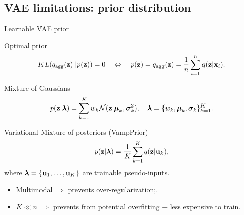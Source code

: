 \documentclass{beamer}
\begin{document}
\subsection{VAE limitations: prior distribution}
\begin{frame}{Learnable VAE prior}
	\begin{block}{Optimal prior}
		\vspace{-0.7cm}
		\[
			KL(q_{\text{agg}}(\mathbf{z}) || p(\mathbf{z})) = 0 \quad \Leftrightarrow \quad p (\mathbf{z}) = q_{\text{agg}}(\mathbf{z}) = \frac{1}{n} \sum_{i=1}^n q(\mathbf{z} | \mathbf{x}_i).
		\]
		\vspace{-0.6cm}
	\end{block}
	\begin{block}{Mixture of Gaussians}
		\vspace{-0.3cm}
		\[
			p(\mathbf{z} | \boldsymbol{\lambda}) = \sum_{k=1}^K w_k \mathcal{N}(\mathbf{z} | \boldsymbol{\mu}_k, \boldsymbol{\sigma}_k^2), \quad \boldsymbol{\lambda} = \{w_k, \boldsymbol{\mu}_k, \boldsymbol{\sigma}_k\}_{k=1}^K.
		\]
		\vspace{-0.5cm}
	\end{block}
	\begin{block}{Variational Mixture of posteriors (VampPrior)}
		\vspace{-0.3cm}
		\[
		p(\mathbf{z} | \boldsymbol{\lambda}) = \frac{1}{K} \sum_{k=1}^K q(\mathbf{z} | \mathbf{u}_k),
		\]
		where $\boldsymbol{\lambda} = \{\mathbf{u}_1, \dots, \mathbf{u}_K\}$ are trainable pseudo-inputs.
	\end{block}
	\begin{itemize}
		\item Multimodal $\Rightarrow$ prevents over-regularization;.
		\item $K \ll n$ $\Rightarrow$ prevents from potential overfitting + less expensive to train.
	\end{itemize}
\end{frame}
\end{document}
